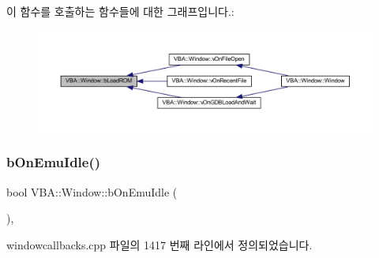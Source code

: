 이 함수를 호출하는 함수들에 대한 그래프입니다.\+:
\nopagebreak
\begin{figure}[H]
\begin{center}
\leavevmode
\includegraphics[width=350pt]{class_v_b_a_1_1_window_a69ddb41bd29d9f0db04175671ff2e2f4_icgraph}
\end{center}
\end{figure}
\mbox{\label{class_v_b_a_1_1_window_a2ac2bae273728c175c38770da8a9ad8a}} 
\subsubsection{\texorpdfstring{b\+On\+Emu\+Idle()}{bOnEmuIdle()}}
{\footnotesize\ttfamily bool V\+B\+A\+::\+Window\+::b\+On\+Emu\+Idle (\begin{DoxyParamCaption}{ }\end{DoxyParamCaption})\hspace{0.3cm}{\ttfamily [protected]}, {\ttfamily [virtual]}}



windowcallbacks.\+cpp 파일의 1417 번째 라인에서 정의되었습니다.


